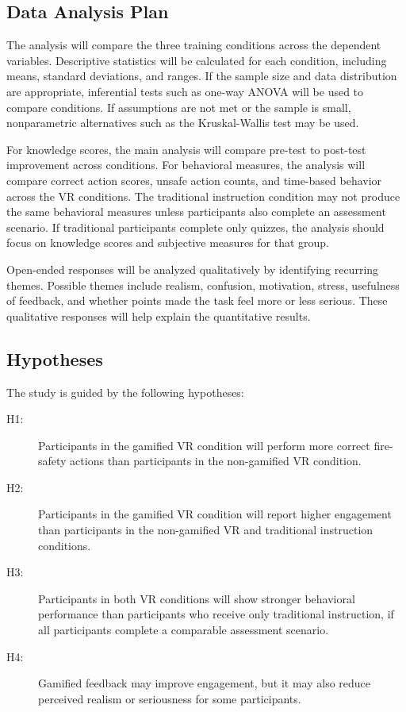 \documentclass[manuscript, review]{acmart}
\begin{document}
{\subsection{Data Analysis Plan}

The analysis will compare the three training conditions across the dependent variables. Descriptive statistics will be calculated for each condition, including means, standard deviations, and ranges. If the sample size and data distribution are appropriate, inferential tests such as one-way ANOVA will be used to compare conditions. If assumptions are not met or the sample is small, nonparametric alternatives such as the Kruskal-Wallis test may be used.

For knowledge scores, the main analysis will compare pre-test to post-test improvement across conditions. For behavioral measures, the analysis will compare correct action scores, unsafe action counts, and time-based behavior across the VR conditions. The traditional instruction condition may not produce the same behavioral measures unless participants also complete an assessment scenario. If traditional participants complete only quizzes, the analysis should focus on knowledge scores and subjective measures for that group.

Open-ended responses will be analyzed qualitatively by identifying recurring themes. Possible themes include realism, confusion, motivation, stress, usefulness of feedback, and whether points made the task feel more or less serious. These qualitative responses will help explain the quantitative results.

\subsection{Hypotheses}

The study is guided by the following hypotheses:

\begin{description}
  \item[H1:] Participants in the gamified VR condition will perform more correct fire-safety actions than participants in the non-gamified VR condition.
  \item[H2:] Participants in the gamified VR condition will report higher engagement than participants in the non-gamified VR and traditional instruction conditions.
  \item[H3:] Participants in both VR conditions will show stronger behavioral performance than participants who receive only traditional instruction, if all participants complete a comparable assessment scenario.
  \item[H4:] Gamified feedback may improve engagement, but it may also reduce perceived realism or seriousness for some participants.
\end{description}

}
\end{document}
